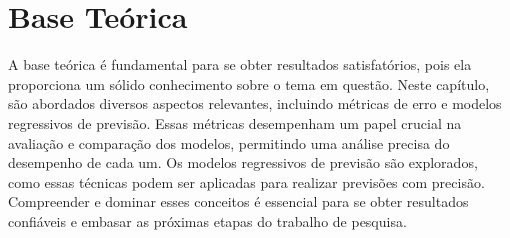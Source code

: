 \section{Base Te\'orica}\label{sec:base}

A base teórica é fundamental para se obter resultados satisfatórios, pois ela proporciona um sólido conhecimento sobre o tema em questão. Neste capítulo, são abordados diversos aspectos relevantes, incluindo métricas de erro e modelos regressivos de previsão. Essas métricas desempenham um papel crucial na avaliação e comparação dos modelos, permitindo uma análise precisa do desempenho de cada um. Os modelos regressivos de previsão são explorados, como essas técnicas podem ser aplicadas para realizar previsões com precisão. Compreender e dominar esses conceitos é essencial para se obter resultados confiáveis e embasar as próximas etapas do trabalho de pesquisa.












